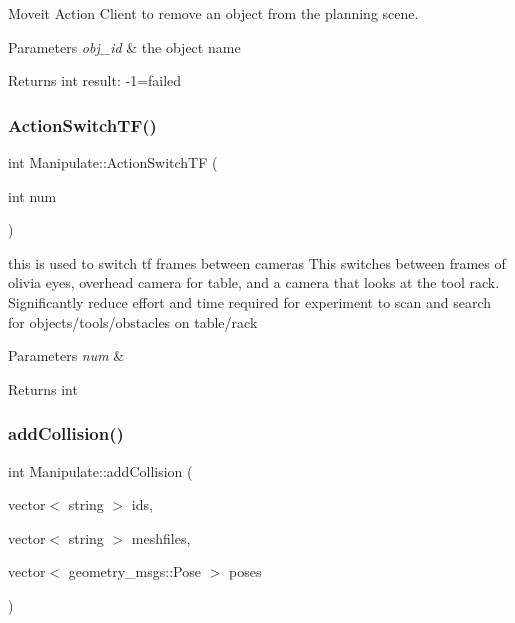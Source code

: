 Moveit Action Client to remove an object from the planning scene. 


\begin{DoxyParams}{Parameters}
{\em obj\+\_\+id} & the object name \\
\hline
\end{DoxyParams}
\begin{DoxyReturn}{Returns}
int result\+: -\/1=failed 
\end{DoxyReturn}
\mbox{\label{structManipulate_a51cda8e5d51dad3a8b7a75484e803bd8}} 
\subsubsection{\texorpdfstring{Action\+Switch\+T\+F()}{ActionSwitchTF()}}
{\footnotesize\ttfamily int Manipulate\+::\+Action\+Switch\+TF (\begin{DoxyParamCaption}\item[{int}]{num }\end{DoxyParamCaption})\hspace{0.3cm}{\ttfamily [private]}}



this is used to switch tf frames between cameras This switches between frames of olivia eyes, overhead camera for table, and a camera that looks at the tool rack. Significantly reduce effort and time required for experiment to scan and search for objects/tools/obstacles on table/rack 


\begin{DoxyParams}{Parameters}
{\em num} & \\
\hline
\end{DoxyParams}
\begin{DoxyReturn}{Returns}
int 
\end{DoxyReturn}
\mbox{\label{structManipulate_a76fc2b66b3fbdacf43cb31cf5ae3c2e4}} 
\subsubsection{\texorpdfstring{add\+Collision()}{addCollision()}}
{\footnotesize\ttfamily int Manipulate\+::add\+Collision (\begin{DoxyParamCaption}\item[{vector$<$ string $>$}]{ids,  }\item[{vector$<$ string $>$}]{meshfiles,  }\item[{vector$<$ geometry\+\_\+msgs\+::\+Pose $>$}]{poses }\end{DoxyParamCaption})\hspace{0.3cm}{\ttfamily [private]}}



